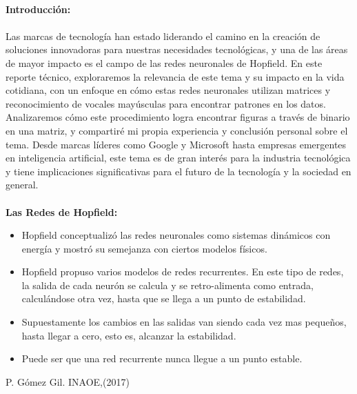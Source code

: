 \documentclass{article}
\begin{document}
\maketitle
\textsf{\ \\
\textbf{Introducción:}\\
\\
Las marcas de tecnología han estado liderando el camino en la creación de soluciones innovadoras para nuestras necesidades tecnológicas, y una de las áreas de mayor impacto es el campo de las redes neuronales de Hopfield. En este reporte técnico, exploraremos la relevancia de este tema y su impacto en la vida cotidiana, con un enfoque en cómo estas redes neuronales utilizan matrices y reconocimiento de vocales mayúsculas para encontrar patrones en los datos. Analizaremos cómo este procedimiento logra encontrar figuras a través de binario en una matriz, y compartiré mi propia experiencia y conclusión personal sobre el tema. Desde marcas líderes como Google y Microsoft hasta empresas emergentes en inteligencia artificial, este tema es de gran interés para la industria tecnológica y tiene implicaciones significativas para el futuro de la tecnología y la sociedad en general. \\}
\\
\textbf{Las Redes de Hopfield:}
\begin{itemize}
    \item Hopfield conceptualizó las redes neuronales como
        sistemas dinámicos con energía y mostró su
        semejanza con ciertos modelos físicos.

    \item Hopfield propuso varios modelos de redes
recurrentes. En este tipo de redes, la salida de cada
neurón se calcula y se retro-alimenta como entrada,
calculándose otra vez, hasta que se llega a un punto
de estabilidad. 
    \item Supuestamente los cambios en las salidas van
siendo cada vez mas pequeños, hasta llegar a cero,
esto es, alcanzar la estabilidad.
    \item Puede ser que una red recurrente nunca llegue a un
punto estable.   
\end{itemize}
\textsf{P. Gómez Gil. INAOE,(2017)}
\\
\end{document}
